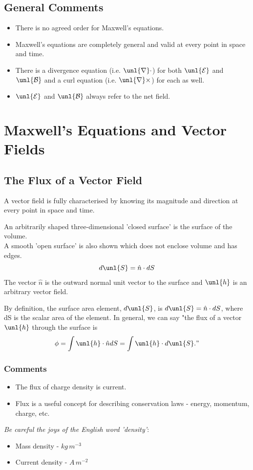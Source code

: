 \documentclass[a4paper, 11pt, normalem]{report}
\newcommand\E{\mathcal{E}}
\newcommand\uE{\unl{\E}}
\newcommand\B{\mathcal{B}}
\newcommand\uB{\unl{\B}}
\newcommand\del{\unl{\nabla}}
\newcommand\hn{\hat{n}}
\begin{document}
\subsection{General Comments}
\begin{itemize}
    \item There is no agreed order for Maxwell's equations.
    \item Maxwell's equations are completely general and valid at every point in space and time.
    \item There is a divergence equation (i.e. $\del \cdot$) for both $\uE$ and $\uB$ and a curl equation (i.e. $\del \times$) for each as well.
    \item $\uE$ and $\uB$ always refer to the net field.
\end{itemize}

\section{Maxwell's Equations and Vector Fields}
\subsection{The Flux of a Vector Field}
A vector field is fully characterised by knowing its magnitude and direction at every point in space and time.

An arbitrarily shaped three-dimensional 'closed surface' is the surface of the volume. \\
A smooth 'open surface' is also shown which does not enclose volume and has edges.
\begin{equation*}
    d\unl{S} = \hn \cdot dS
\end{equation*}
The vector $\hn$ is the outward normal unit vector to the surface and $\unl{h}$ is an arbitrary vector field.

By definition, the surface area element, $d\unl{S}$, is $d\unl{S} = \hn \cdot dS$, where dS is the scalar area of the element.
In general, we can say "the flux of a vector $\unl{h}$ through the surface is
\begin{equation*}
    \phi = \int \unl{h} \cdot \hn dS = \int \unl{h} \cdot d\unl{S}."
\end{equation*}

\subsubsection{Comments}
\begin{itemize}
    \item The flux of charge density is current.
    \item Flux is a useful concept for describing conservation laws - energy, momentum, charge, etc.
\end{itemize}
\emph{Be careful the joys of the English word 'density'}:
\begin{itemize}
    \item Mass density - $kg\,m^{-3}$
    \item Current density - $A\,m^{-2}$
\end{itemize}
\end{document}
